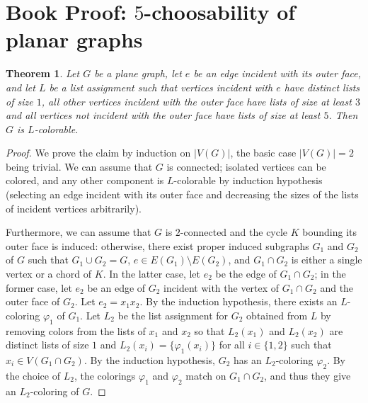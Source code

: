 \documentclass[12pt,twoside,openright,a4paper]{book}
\newtheorem{theorem}{Theorem}[chapter]
\begin{document}
\section{Book Proof: $5$-choosability of planar graphs}

\begin{theorem}\label{thm:5choosbook}
Let $G$ be a plane graph, let $e$ be an edge incident with its outer face,
and let $L$ be a list assignment such that vertices incident with $e$ have distinct
lists of size $1$, all other vertices incident with the outer face have lists of size at least $3$
and all vertices not incident with the outer face have lists of size at least $5$.  Then $G$ is $L$-colorable.
\end{theorem}
\begin{proof}
We prove the claim by induction on $|V(G)|$, the basic case $|V(G)|=2$ being trivial.
We can assume that $G$ is connected; isolated vertices can be colored, and any other component
is $L$-colorable by induction hypothesis (selecting an edge incident with its outer face and decreasing
the sizes of the lists of incident vertices arbitrarily).

Furthermore, we can assume that $G$ is $2$-connected
and the cycle $K$ bounding its outer face is induced: otherwise, there exist proper induced subgraphs $G_1$ and $G_2$
of $G$ such that $G_1\cup G_2=G$, $e\in E(G_1)\setminus E(G_2)$, and $G_1\cap G_2$ is either a single vertex or a chord of $K$.
In the latter case, let $e_2$ be the edge of $G_1\cap G_2$; in the former case, let $e_2$ be an edge of $G_2$ incident with the
vertex of $G_1\cap G_2$ and the outer face of $G_2$.  Let $e_2=x_1x_2$.  By the induction hypothesis, there exists an $L$-coloring $\varphi_1$ of
$G_1$.  Let $L_2$ be the list assignment for $G_2$ obtained from $L$ by removing colors from the lists of $x_1$ and $x_2$
so that $L_2(x_1)$ and $L_2(x_2)$ are distinct lists of size $1$ and $L_2(x_i)=\{\varphi_1(x_i)\}$ for all $i\in\{1,2\}$
such that $x_i\in V(G_1\cap G_2)$.  By the induction hypothesis, $G_2$ has an $L_2$-coloring $\varphi_2$.  By the choice
of $L_2$, the colorings $\varphi_1$ and $\varphi_2$ match on $G_1\cap G_2$, and thus they give an $L_2$-coloring of $G$.


\end{proof}
\end{document}
